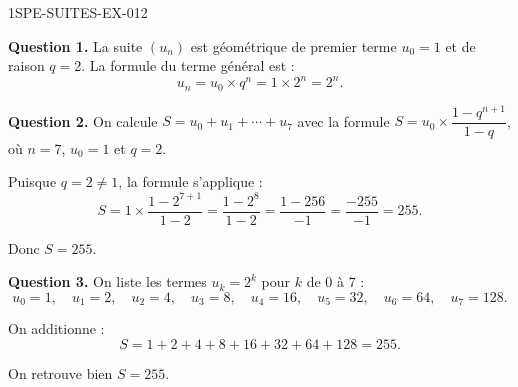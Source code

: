 \begin{corrige}{1SPE-SUITES-EX-012}


\textbf{Question 1.} La suite $(u_n)$ est géométrique de premier terme $u_0 = 1$ et de raison $q = 2$. La formule du terme général est :
\[
u_n = u_0 \times q^n = 1 \times 2^n = 2^n.
\]


\textbf{Question 2.} On calcule $S = u_0 + u_1 + \cdots + u_7$ avec la formule $S = u_0 \times \dfrac{1 - q^{n+1}}{1 - q}$, où $n = 7$, $u_0 = 1$ et $q = 2$.

Puisque $q = 2
\neq 1$, la formule s'applique :
\[
S = 1 \times \frac{1 - 2^{7+1}}{1 - 2} = \frac{1 - 2^8}{1 - 2} = \frac{1 - 256}{-1} = \frac{-255}{-1} = 255.
\]

Donc $S = 255$.


\textbf{Question 3.} On liste les termes $u_k = 2^k$ pour $k$ de $0$ à $7$ :
\[
u_0 = 1,\quad u_1 = 2,\quad u_2 = 4,\quad u_3 = 8,\quad u_4 = 16,\quad u_5 = 32,\quad u_6 = 64,\quad u_7 = 128.
\]

On additionne :
\[
S = 1 + 2 + 4 + 8 + 16 + 32 + 64 + 128 = 255.
\]

On retrouve bien $S = 255$. \checkmark

\end{corrige}
